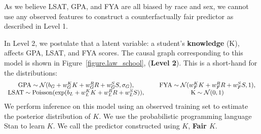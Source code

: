 As we believe LSAT, GPA, and FYA are all biased by race and sex, we
cannot use any observed features to construct a counterfactually fair
predictor as described in Level 1. %

In Level 2, we postulate that a latent variable: a student's
\textbf{knowledge} (K), affects GPA, LSAT, and FYA scores. The causal
graph corresponding to this model is shown in
Figure~\ref{figure.law_school}, (\textbf{Level 2}). This is a
short-hand for the distributions:
\[
\begin{array}{cc}
  \mbox{GPA} \sim {\cal N}(b_{G} + w_{G}^K K + w_{G}^R R + w_{G}^S S, \sigma_{G}),&  \hspace{0.2in}
  \mbox{FYA} \sim {\cal N}(w_{F}^K K + w_{F}^R R + w_{F}^S S, 1),\\
  \mbox{LSAT} \sim \textrm{Poisson}(\exp(b_{L} + w_{L}^K K + w_{L}^R R + w_{L}^S S)),& \hspace{0.2in}
  \mbox{K} \sim {\cal N}(0,1)
\end{array}
\]
We perform inference on this model using an observed training set to
estimate the posterior distribution of $K$. We use the probabilistic
programming language Stan \cite{rstan} to learn $K$. We call the
predictor constructed using $K$, \textbf{Fair $K$}.


